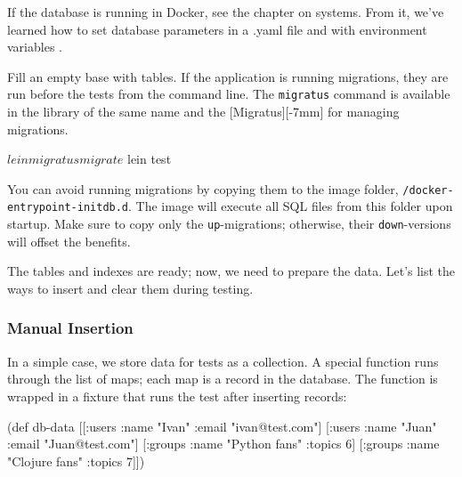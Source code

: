 
If the database is running in Docker, see the chapter on systems. From it, we've learned how to set database parameters in a .yaml file and with environment variables .


Fill an empty base with tables. If the application is running migrations, they are run before the tests from the command line. The \verb|migratus| command is available in the library of the same name and the [Migratus][-7mm] for managing migrations.

\begin{english}
  \begin{clojure}
$ lein migratus migrate
$ lein test
  \end{clojure}
\end{english}

You can avoid running migrations by copying them to the image folder, \texttt{/docker-entry\-point-initdb.d}. The image will execute all SQL files from this folder upon startup. Make sure to copy only the \verb|up|-migrations; otherwise, their \verb|down|-versions will offset the benefits.

The tables and indexes are ready; now, we need to prepare the data. Let's list the ways to insert and clear them during testing.

\subsubsection*{Manual Insertion}

In a simple case, we store data for tests as a collection. A special function runs through the list of maps; each map is a record in the database. The function is wrapped in a fixture that runs the test after inserting records:

\ifnarrow

\begin{english}
  \begin{clojure}
(def db-data
 [[:users {:name "Ivan"
           :email "ivan@test.com"}]
  [:users {:name "Juan"
           :email "Juan@test.com"}]
  [:groups {:name "Python fans"
            :topics 6}]
  [:groups {:name "Clojure fans"
            :topics 7}]])
  \end{clojure}
\end{english}

\else

